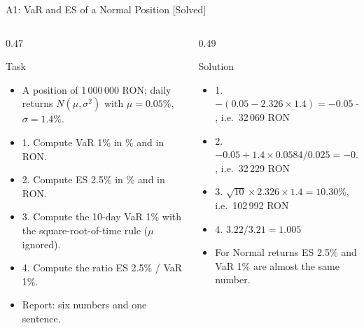 \begin{frame}{A1: VaR and ES of a Normal Position [Solved]}
\itemsize{\scriptsize}
\begin{columns}[T]
\begin{column}{0.47\textwidth}
\begin{block}{Task}
\begin{itemize}
    \item A position of 1\,000\,000 RON; daily returns $N(\mu, \sigma^2)$ with $\mu = 0.05\%$, $\sigma = 1.4\%$.
    \item 1. Compute VaR 1\% in \% and in RON.
    \item 2. Compute ES 2.5\% in \% and in RON.
    \item 3. Compute the 10-day VaR 1\% with the square-root-of-time rule ($\mu$ ignored).
    \item 4. Compute the ratio ES 2.5\% / VaR 1\%.
    \item Report: six numbers and one sentence.
\end{itemize}
\end{block}
\end{column}
\begin{column}{0.49\textwidth}
\begin{exampleblock}{Solution}
\begin{itemize}
    \item 1. $-(0.05 - 2.326 \times 1.4) = -0.05 + 3.256 = 3.21\%$, i.e.\ 32\,069 RON
    \item 2. $-0.05 + 1.4 \times 0.0584/0.025 = -0.05 + 3.270 = 3.22\%$, i.e.\ 32\,229 RON
    \item 3. $\sqrt{10} \times 2.326 \times 1.4 = 10.30\%$, i.e.\ 102\,992 RON
    \item 4. $3.22/3.21 = 1.005$
    \item For Normal returns ES 2.5\% and VaR 1\% are almost the same number.
\end{itemize}
\end{exampleblock}
\end{column}
\end{columns}
\end{frame}

